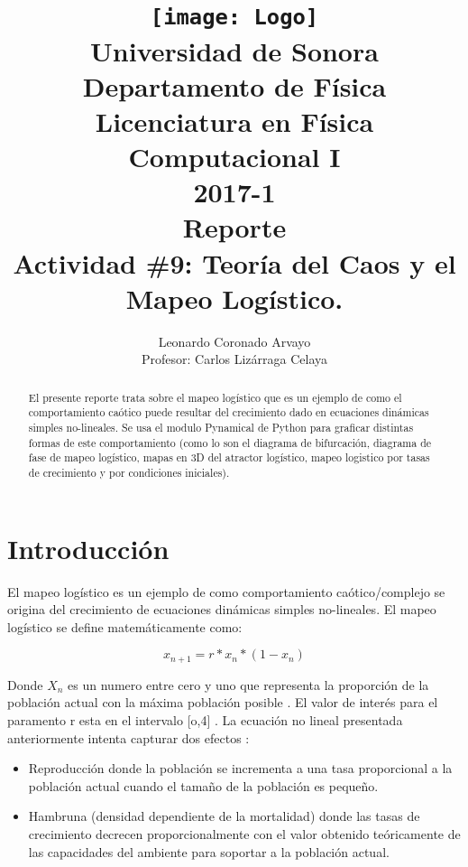 \documentclass[12pt,letterpaper]{article}
\author{
Leonardo Coronado Arvayo\\
Profesor: Carlos Lizárraga Celaya   \vspace*{1.25in}}
\title{	\texttt{[image: Logo]} \\
Universidad de Sonora \\
{\small Departamento de Física \\
Licenciatura en Física \\
Computacional I \\
2017-1 \\
\vspace{0.55in} Reporte}\\ 
{\Huge Actividad \#9: Teoría del Caos y el Mapeo Logístico. }\\
\vspace*{1.0in}}
\begin{document}
	\maketitle
\newpage
	\tableofcontents
\pagebreak

\begin{abstract}

El presente reporte trata sobre el mapeo logístico que es un ejemplo de como el comportamiento caótico puede resultar del crecimiento dado en ecuaciones dinámicas simples no-lineales. Se usa el modulo Pynamical \cite{b} de Python para graficar distintas formas de este comportamiento (como lo son el diagrama de bifurcación, diagrama de fase de mapeo logístico, mapas en 3D del atractor logístico, mapeo logistico por tasas de crecimiento y por condiciones iniciales).


\end{abstract}


\section{Introducción}

El mapeo logístico es un ejemplo de como comportamiento caótico/complejo se origina del crecimiento de ecuaciones dinámicas simples no-lineales\cite{a}. El mapeo logístico se define matemáticamente como:

$$x_{n+1} = r*x_{n}*(1-x_{n}) $$

Donde $X_{n}$ es un numero entre cero y uno que representa la proporción de la población actual con la máxima población posible \cite{a}. El valor de interés para el paramento r esta en el intervalo [o,4] \cite{a}. La ecuación no lineal presentada anteriormente intenta capturar dos efectos \cite{a}:

\begin{itemize}
\item Reproducción donde la población se incrementa a una tasa proporcional a la población actual cuando el tamaño de la población es pequeño.
\item Hambruna (densidad dependiente de la mortalidad) donde las tasas de crecimiento decrecen proporcionalmente con el valor obtenido teóricamente de las capacidades del ambiente para soportar a la población actual.
\end{itemize}
\end{document}
